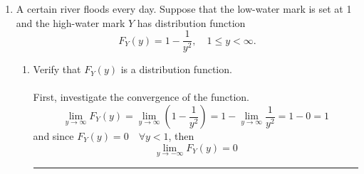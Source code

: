 \documentclass[twoside]{article}
\theoremstyle{definition}
\theoremstyle{remark}
\newenvironment{sol}{{\bf Solution:}}{\hfill\rule{2mm}{2mm}}
\begin{document}
\begin{enumerate}
  \clearpage
  \item A certain river floods every day. Suppose that the low-water mark is set
  at 1 and the high-water mark $Y$ has distribution function
  \begin{equation}
    F_Y(y) = 1 - \frac{1}{y^2}, \quad 1 \leq y < \infty.
  \end{equation}
  \begin{enumerate}
    \item Verify that $F_Y(y)$ is a distribution function. \\
    \begin{sol} \\
      First, investigate the convergence of the function.
      \begin{equation}
        \lim_{y \rightarrow \infty} F_Y(y)
        = \lim_{y \rightarrow \infty} \left( 1 - \frac{1}{y^2} \right)
        = 1 - \lim_{y \rightarrow \infty} \frac{1}{y^2}
        = 1 - 0 = 1
      \end{equation}
      and since $F_Y(y) = 0 \quad \forall y < 1$, then
      \begin{equation}
        \lim_{y \rightarrow -\infty} F_Y(y) = 0
      \end{equation}


\end{sol}
\end{enumerate}
\end{enumerate}
\end{document}
